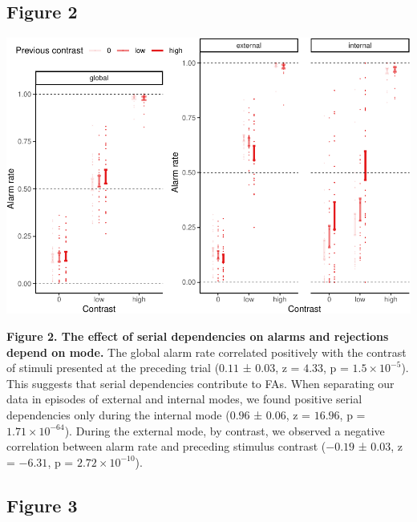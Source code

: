 \documentclass[
]{article}
\begin{document}
\newpage

\hypertarget{figure-2}{%
\subsection{Figure 2}\label{figure-2}}

\includegraphics{predictive_templates_files/figure-latex/rev_Figure_2-1.pdf}

\textbf{Figure 2. The effect of serial dependencies on alarms and
rejections depend on mode.} The global alarm rate correlated positively
with the contrast of stimuli presented at the preceding trial (\(0.11\)
± \(0.03\), z = \(4.33\), p = \(\ensuremath{1.5\times 10^{-5}}\)). This
suggests that serial dependencies contribute to FAs. When separating our
data in episodes of external and internal modes, we found positive
serial dependencies only during the internal mode (\(0.96\) ± \(0.06\),
z = \(16.96\), p = \(\ensuremath{1.71\times 10^{-64}}\)). During the
external mode, by contrast, we observed a negative correlation between
alarm rate and preceding stimulus contrast (\(-0.19\) ± \(0.03\), z =
\(-6.31\), p = \(\ensuremath{2.72\times 10^{-10}}\)).

\newpage

\hypertarget{figure-3}{%
\subsection{Figure 3}\label{figure-3}}
\end{document}
